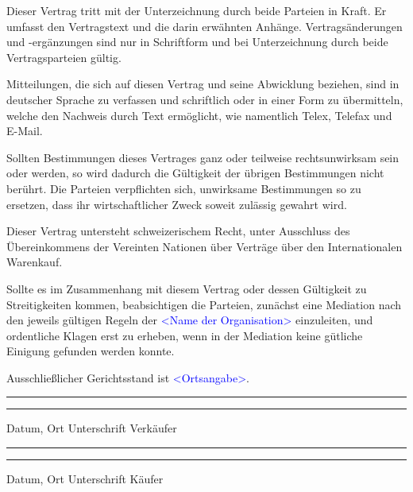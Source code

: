 \documentclass[parskip=half]{scrreprt}
\begin{document}
\begin{contract}

Dieser Vertrag tritt mit der Unterzeichnung durch beide Parteien in Kraft. Er umfasst den Vertragstext und die darin erwähnten Anhänge. Vertragsänderungen und -ergänzungen sind nur in Schriftform und bei Unterzeichnung durch beide Vertragsparteien gültig.

Mitteilungen, die sich auf diesen Vertrag und seine Abwicklung beziehen, sind in deutscher Sprache zu verfassen und schriftlich oder in einer Form zu übermitteln, welche den Nachweis durch Text ermöglicht, wie namentlich Telex, Telefax und E-Mail.




Sollten Bestimmungen dieses Vertrages ganz oder teilweise rechtsunwirksam sein oder werden, so wird dadurch die Gültigkeit der übrigen Bestimmungen nicht berührt. Die Parteien verpflichten sich, unwirksame Bestimmungen so zu ersetzen, dass ihr wirtschaftlicher Zweck soweit zulässig gewahrt wird.




Dieser Vertrag untersteht schweizerischem Recht, unter Ausschluss des Übereinkommens der Vereinten Nationen über Verträge über den Internationalen Warenkauf.




Sollte es im Zusammenhang mit diesem Vertrag oder dessen Gültigkeit zu Streitigkeiten kommen, beabsichtigen die Parteien, zunächst eine Mediation nach den jeweils gültigen Regeln der \textcolor{blue}{<Name der Organisation>} einzuleiten, und ordentliche Klagen erst zu erheben, wenn in der Mediation keine gütliche Einigung gefunden werden konnte.

Ausschließlicher Gerichtsstand ist \textcolor{blue}{<Ortsangabe>}.

\end{contract}

\vspace{50pt} 
\noindent\rule{7cm}{.4pt}\hfill\rule{7cm}{.4pt}\par 
\noindent Datum, Ort \hfill Unterschrift Verkäufer

\vspace{50pt} 
\noindent\rule{7cm}{.4pt}\hfill\rule{7cm}{.4pt}\par 
\noindent Datum, Ort \hfill Unterschrift Käufer
\end{document}
